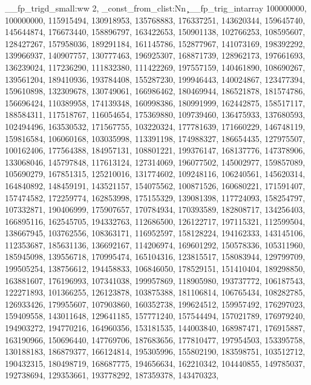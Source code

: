 {{    { \__fp_trigd_small:ww 2, }
  }
\intarray_const_from_clist:Nn \c__fp_trig_intarray
  {
    100000000, 100000000, 115915494, 130918953, 135768883, 176337251,
    143620344, 159645740, 145644874, 176673440, 158896797, 163422653,
    150901138, 102766253, 108595607, 128427267, 157958036, 189291184,
    161145786, 152877967, 141073169, 198392292, 139966937, 140907757,
    130777463, 196925307, 168871739, 128962173, 197661693, 136239024,
    117236290, 111832380, 111422269, 197557159, 140461890, 108690267,
    139561204, 189410936, 193784408, 155287230, 199946443, 140024867,
    123477394, 159610898, 132309678, 130749061, 166986462, 180469944,
    186521878, 181574786, 156696424, 110389958, 174139348, 160998386,
    180991999, 162442875, 158517117, 188584311, 117518767, 116054654,
    175369880, 109739460, 136475933, 137680593, 102494496, 163530532,
    171567755, 103220324, 177781639, 171660229, 146748119, 159816584,
    106060168, 103035998, 113391198, 174988327, 186654435, 127975507,
    100162406, 177564388, 184957131, 108801221, 199376147, 168137776,
    147378906, 133068046, 145797848, 117613124, 127314069, 196077502,
    145002977, 159857089, 105690279, 167851315, 125210016, 131774602,
    109248116, 106240561, 145620314, 164840892, 148459191, 143521157,
    154075562, 100871526, 160680221, 171591407, 157474582, 172259774,
    162853998, 175155329, 139081398, 117724093, 158254797, 107332871,
    190406999, 175907657, 170784934, 170393589, 182808717, 134256403,
    166895116, 162545705, 194332763, 112686500, 126122717, 197115321,
    112599504, 138667945, 103762556, 108363171, 116952597, 158128224,
    194162333, 143145106, 112353687, 185631136, 136692167, 114206974,
    169601292, 150578336, 105311960, 185945098, 139556718, 170995474,
    165104316, 123815517, 158083944, 129799709, 199505254, 138756612,
    194458833, 106846050, 178529151, 151410404, 189298850, 163881607,
    176196993, 107341038, 199957869, 118905980, 193737772, 106187543,
    122271893, 101366255, 126123878, 103875388, 181106814, 106765434,
    108282785, 126933426, 179955607, 107903860, 160352738, 199624512,
    159957492, 176297023, 159409558, 143011648, 129641185, 157771240,
    157544494, 157021789, 176979240, 194903272, 194770216, 164960356,
    153181535, 144003840, 168987471, 176915887, 163190966, 150696440,
    147769706, 187683656, 177810477, 197954503, 153395758, 130188183,
    186879377, 166124814, 195305996, 155802190, 183598751, 103512712,
    190432315, 180498719, 168687775, 194656634, 162210342, 104440855,
    149785037, 192738694, 129353661, 193778292, 187359378, 143470323,
}}
